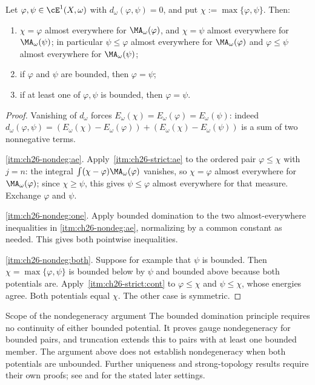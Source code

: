 \begin{corollary}
\label{cor:ch26-gauge-nondegenerate}
Let $\varphi,\psi\in\cE^1(X,\omega)$ with
$d_\omega(\varphi,\psi)=0$, and put $\chi:=\max\{\varphi,\psi\}$.  Then:
\begin{enumerate}
\item\label{itm:ch26-nondeg:ae}
 $\chi=\varphi$ almost everywhere for $\MA_\omega(\varphi)$, and
 $\chi=\psi$ almost everywhere for $\MA_\omega(\psi)$; in particular
 $\psi\leq\varphi$ almost everywhere for $\MA_\omega(\varphi)$ and
 $\varphi\leq\psi$ almost everywhere for $\MA_\omega(\psi)$;
\item\label{itm:ch26-nondeg:one}
 if $\varphi$ and $\psi$ are bounded, then $\varphi=\psi$;
\item\label{itm:ch26-nondeg:both}
 if at least one of $\varphi,\psi$ is bounded, then $\varphi=\psi$.
\end{enumerate}
\end{corollary}

\begin{proof}
Vanishing of $d_\omega$ forces
$E_\omega(\chi)=E_\omega(\varphi)=E_\omega(\psi)$: indeed
$d_\omega(\varphi,\psi)=(E_\omega(\chi)-E_\omega(\varphi))
+(E_\omega(\chi)-E_\omega(\psi))$ is a sum of two nonnegative terms.

\cref{itm:ch26-nondeg:ae}.  Apply
\,\cref{itm:ch26-strict:ae} to the ordered
pair $\varphi\leq\chi$ with $j=n$: the integral
$\int(\chi-\varphi)\MA_\omega(\varphi)$ vanishes, so $\chi=\varphi$
almost everywhere for $\MA_\omega(\varphi)$; since $\chi\geq\psi$, this
gives $\psi\leq\varphi$ almost everywhere for that measure.  Exchange
$\varphi$ and $\psi$.

\cref{itm:ch26-nondeg:one}.  Apply bounded domination to the two
almost-everywhere inequalities in \cref{itm:ch26-nondeg:ae}, normalizing
by a common constant as needed.  This gives both pointwise inequalities.

\cref{itm:ch26-nondeg:both}.  Suppose for example that $\psi$ is bounded.
Then $\chi=\max\{\varphi,\psi\}$ is bounded below by $\psi$ and bounded
above because both potentials are.  Apply
\,\cref{itm:ch26-strict:cont} to
$\varphi\leq\chi$ and $\psi\leq\chi$, whose energies agree.
Both potentials equal $\chi$.  The other case is symmetric.
\end{proof}

\begin{warning}{Scope of the nondegeneracy argument}
The bounded domination principle requires no continuity of either bounded
potential.  It proves gauge nondegeneracy for bounded pairs, and truncation
extends this to pairs with at least one bounded member.  The argument above
does not establish nondegeneracy when both potentials are unbounded.
Further uniqueness and strong-topology results require their own proofs;
see  and
\cite[\S12]{BJ22} for the stated later settings.
\end{warning}

